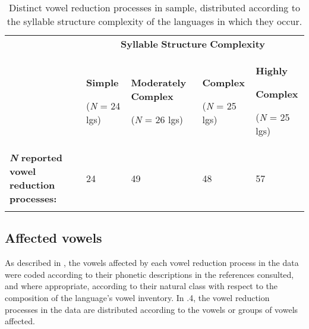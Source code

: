 \begin{table}
\begin{tabularx}{\textwidth}{XXXXX}
\lsptoprule
 & \multicolumn{4}{c}{ \textbf{Syllable} \textbf{Structure} \textbf{Complexity}}\\
& { \textbf{Simple}}

 (\textit{N} = 24 lgs) & { \textbf{Moderately} \textbf{Complex}}

 (\textit{N} = 26 lgs) & { \textbf{Complex}}

 (\textit{N} = 25 lgs) & { \textbf{Highly} }

{ \textbf{Complex}}

 (\textit{N} = 25 lgs)\\
 \textbf{\textit{N}} \textbf{reported} \textbf{vowel} \textbf{reduction} \textbf{processes:} & 24 & 49 & 48 & 57\\
\lspbottomrule
\end{tabularx}
\caption{\label{6.3}Distinct vowel reduction processes in sample, distributed according to the syllable structure complexity of the languages in which they occur.}
\end{table}

\subsection{Affected vowels}\label{sec:6.3.3}

  As described in , the vowels affected by each vowel reduction process in the data were coded according to their phonetic descriptions in the references consulted, and where appropriate, according to their natural class with respect to the composition of the language’s vowel inventory. In .4, the vowel reduction processes in the data are distributed according to the vowels or groups of vowels affected.

